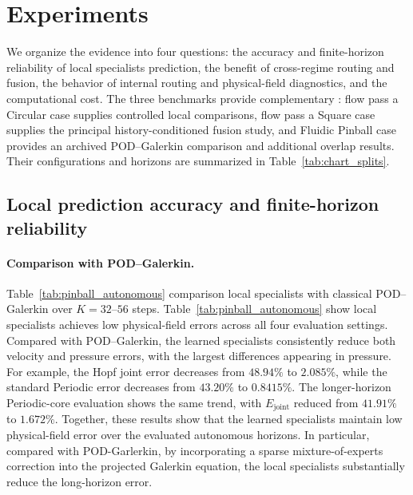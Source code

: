 \section{Experiments}
\label{sec:experiments}

We organize the evidence into four questions: the accuracy and
finite-horizon reliability of local specialists  prediction, the benefit of
cross-regime routing and fusion, the behavior of internal routing
and physical-field diagnostics, and the computational cost.
The three benchmarks provide complementary : flow pass a Circular case supplies controlled local comparisons, flow pass a Square  case supplies the principal history-conditioned fusion study, and Fluidic Pinball case
provides an archived POD--Galerkin comparison and additional overlap
results. Their configurations and horizons are summarized in
Table~\ref{tab:chart_splits}.



\subsection{Local prediction accuracy and finite-horizon reliability}
\label{sec:exp_local}

\paragraph{Comparison with POD--Galerkin.}
Table~\ref{tab:pinball_autonomous}  
 comparison  local specialists with classical POD--Galerkin over
$K=32$--$56$ steps. Table~\ref{tab:pinball_autonomous} show local specialists achieves low physical-field errors across all four evaluation settings. Compared with POD--Galerkin, the learned specialists consistently reduce both velocity and pressure errors, with the largest differences appearing in pressure. For example, the Hopf joint error decreases from $48.94\%$ to $2.085\%$, while the standard Periodic error decreases from $43.20\%$ to $0.8415\%$. The longer-horizon Periodic-core evaluation shows the same trend, with $E_{\mathrm{joint}}$ reduced from $41.91\%$ to $1.672\%$. Together, these results show that the learned specialists maintain low physical-field error over the evaluated autonomous horizons. In particular, compared with POD-Garlerkin, by incorporating a sparse mixture-of-experts correction into the projected Galerkin equation, the local specialists substantially reduce the
long-horizon error.


